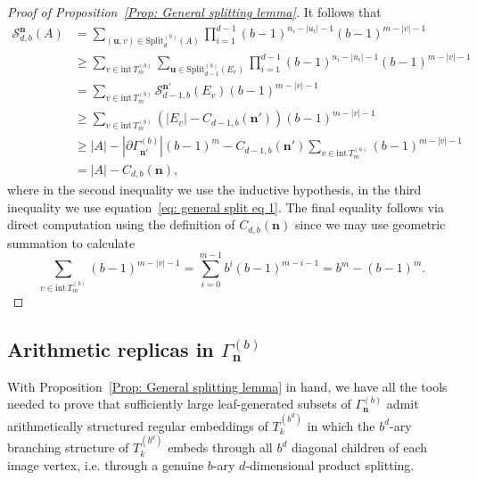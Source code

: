 \documentclass[11pt]{amsart}
\newcommand\labs[1]{\left\lvert#1\right\rvert}
\newcommand{\Split}{\mathrm{Split}}
\newcommand{\inte}{\mathrm{int}\,}
\renewcommand{\geq}{\geqslant}
\theoremstyle{plain}
\theoremstyle{definition}
\theoremstyle{remark}
\begin{document}
\begin{proof}[Proof of Proposition~\ref{Prop: General splitting lemma}]
It follows that
\begin{align*}
\mathcal{S}_{d,b}^\mathbf{n}(A)&=  \sum_{(\mathbf{u},v) \in \Split_d^{(b)}(A)} \prod_{i=1}^{d-1} \left(b-1\right)^{n_i - \labs{u_i}-1}(b-1)^{m-\labs{v}-1}\\
&\geq \sum_{v \in \inte T_m^{(b)}}\sum_{\mathbf{u} \in \Split_{d-1}^{(b)}(E_v)}\prod_{i=1}^{d-1} \left(b-1\right)^{n_i - \labs{u_i}-1}(b-1)^{m-\labs{v}-1}\\
&= \sum_{v \in \inte T_m^{(b)}} \mathcal{S}_{d-1,b}^{\mathbf{n}'}(E_v) (b-1)^{m-\labs{v}-1}\\
& \geq \sum_{v \in \inte T_m^{(b)}} \left( \labs{E_v} - C_{d-1,b}(\mathbf{n}')\right) (b-1)^{m-\labs{v}-1}\\
&\geq \labs{A} - \labs{\partial \Gamma_{\mathbf{n}'}^{(b)}}(b-1)^m - C_{d-1,b}(\mathbf{n}') \sum_{v\in \inte T_m^{(b)}} (b-1)^{m-\labs{v}-1}\\
& = \labs{A} - C_{d,b}(\mathbf{n}),
\end{align*}
where in the second inequality we use the inductive hypothesis, in the third inequality we use equation~\eqref{eq: general split eq 1}. The final equality follows via direct computation using the definition of $C_{d,b}(\mathbf{n})$ since we may use geometric summation to calculate
\[ \sum_{v\in \inte T_m^{(b)}} (b-1)^{m-\labs{v}-1} = \sum_{i=0}^{m-1} b^i (b-1)^{m-i-1} = b^m - (b-1)^m.\]
\end{proof}
\subsection{Arithmetic replicas in \texorpdfstring{$\Gamma_{\mathbf{n}}^{(b)}$}{Gamma(n,b)}}
With Proposition~\ref{Prop: General splitting lemma} in hand, we have all the tools needed to prove that sufficiently large leaf-generated subsets of $\Gamma_{\mathbf{n}}^{(b)}$ admit arithmetically structured regular embeddings of $T_k^{\left(b^d\right)}$ in which the $b^d$-ary branching structure of $T_k^{\left(b^d\right)}$ embeds through all $b^d$ diagonal children of each image vertex, i.e. through a genuine $b$-ary $d$-dimensional product splitting.
\end{document}
